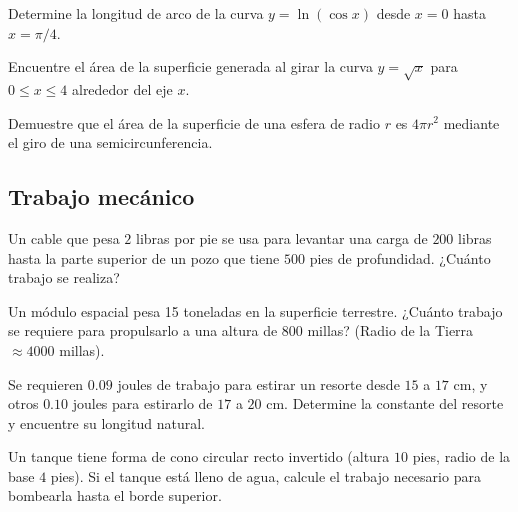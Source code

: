
\begin{prob}
Determine la longitud de arco de la curva $y = \ln(\cos x)$ desde $x = 0$ hasta $x = \pi/4$.
\end{prob}

\begin{prob}
Encuentre el área de la superficie generada al girar la curva $y = \sqrt{x}$ para $0 \leq x \leq 4$ alrededor del eje $x$.
\end{prob}


\begin{prob}
Demuestre que el área de la superficie de una esfera de radio $r$ es $4\pi r^2$ mediante el giro de una semicircunferencia.
\end{prob}

\subsection{Trabajo mecánico}


\begin{prob}
Un cable que pesa $2$ libras por pie se usa para levantar una carga de $200$ libras hasta la parte superior de un pozo que tiene $500$ pies de profundidad. ¿Cuánto trabajo se realiza?
\end{prob}


\begin{prob}
Un módulo espacial pesa 15 toneladas en la superficie terrestre. ¿Cuánto trabajo se requiere para propulsarlo a una altura de 800 millas? (Radio de la Tierra $\approx 4000$ millas).
\end{prob}

\begin{prob}
Se requieren $0.09$ joules de trabajo para estirar un resorte desde $15$ a $17$ cm, y otros $0.10$ joules para estirarlo de $17$ a $20$ cm. Determine la constante del resorte y encuentre su longitud natural.
\end{prob}


\begin{prob}
Un tanque tiene forma de cono circular recto invertido (altura $10$ pies, radio de la base $4$ pies). Si el tanque está lleno de agua, calcule el trabajo necesario para bombearla hasta el borde superior.
\end{prob}

